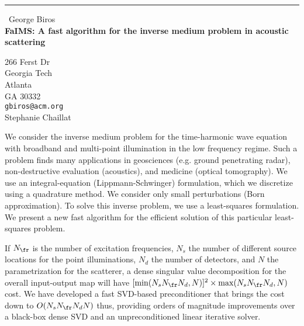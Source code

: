 \documentclass{report}
\begin{document}
\begin{center}
\rule{6in}{1pt} \
{\large George Biros \\
{\bf FaIMS: A fast algorithm for the inverse medium problem in acoustic scattering}}

266 Ferst Dr \\ Georgia Tech \\ Atlanta \\ GA 30332
\\
{\tt gbiros@acm.org}\\
Stephanie Chaillat\end{center}

We consider the inverse medium problem for the time-harmonic
wave equation with broadband and multi-point illumination in the low
frequency regime. Such a problem finds many applications in
geosciences (e.g. ground penetrating radar), non-destructive
evaluation (acoustics), and medicine (optical tomography). We use an
integral-equation (Lippmann-Schwinger) formulation, which we
discretize using a quadrature method. We consider only small
perturbations (Born approximation). To solve this inverse problem, we
use a least-squares formulation. We present a new fast algorithm for
the efficient solution of this particular least-squares problem.

If $N_{\fr}$ is the number of excitation frequencies, $N_{s}$ the
number of different source locations for the point illuminations,
$N_{d}$ the number of detectors, and $N$ the parametrization for the
scatterer, a dense singular value decomposition for the overall
input-output map will have $ [\min(N_{s} N_{\fr}N_{d}, N)]^{2}
\times \max(N_{s} N_{\fr}N_{d}, N) $ cost. We have developed a fast
SVD-based preconditioner that brings the cost down to $O( N_{s}N_{\fr} N_{d}
N)$ thus, providing orders of magnitude improvements over a black-box
dense SVD and an unpreconditioned linear iterative solver.
\end{document}
